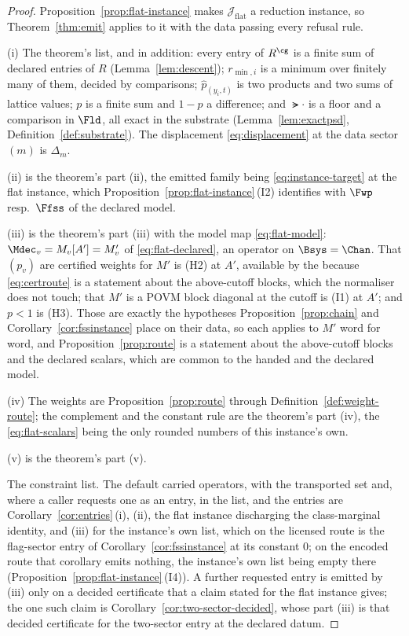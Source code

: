 \begin{proof}
Proposition~\ref{prop:flat-instance} makes $\mathcal{J}_{\mathrm{flat}}$ a
reduction instance, so Theorem~\ref{thm:emit} applies to it with the data
passing every refusal rule.

(i) The theorem's list, and in addition: every entry of
$R^{\cg}$ is a finite sum of declared entries of $R$ (Lemma~\ref{lem:descent});
$r_{\min,i}$ is a minimum over finitely many of them, decided by comparisons;
$\hat p_{(y_i,t)}$ is two products and two sums of lattice values;
$p$ is a finite sum and $1-p$ a difference; and $\lat{\cdot}$ is a floor and
a comparison in $\Fld$, all exact in the substrate
(Lemma~\ref{lem:exactpsd}, Definition~\ref{def:substrate}). The displacement
\eqref{eq:displacement} at the data sector $(m)$ is $\Delta_m$.

(ii) is the theorem's part (ii), the emitted family being
\eqref{eq:instance-target} at the flat instance, which
Proposition~\ref{prop:flat-instance}\,(I2) identifies with $\Fwp$ resp.\
$\Ffss$ of the declared model.

(iii) is the theorem's part (iii) with the model map \eqref{eq:flat-model}:
$\Mdec_v=M_v[A']=M'_v$ of \eqref{eq:flat-declared}, an operator on $\Bsys=\Chan$.
That $(p_v)$ are certified weights for $M'$ is (H2) at $A'$, available by the
\tref{stability clause} because \eqref{eq:certroute} is a statement about the
above-cutoff blocks, which the normaliser does not touch; that $M'$ is a POVM
block diagonal at the cutoff is (I1) at $A'$; and $p<1$ is (H3). Those are
exactly the hypotheses Proposition~\ref{prop:chain} and
Corollary~\ref{cor:fssinstance} place on their data, so each applies to $M'$
word for word, and Proposition~\ref{prop:route} is a statement about the
above-cutoff blocks and the declared scalars, which are common to the handed
and the declared model.

(iv) The weights are Proposition~\ref{prop:route}
through Definition~\ref{def:weight-route}; the complement and the constant
rule are the theorem's part (iv), the \tref[scalar value]{scalar values}
\eqref{eq:flat-scalars}
being the only rounded numbers of this instance's own.

(v) is the theorem's part (v).

The constraint list. The default carried operators, with the transported
set and, where a caller requests one as an entry, in the list, and the
entries are Corollary~\ref{cor:entries}\,(i), (ii), the
flat instance discharging the class-marginal identity, and (iii) for the
instance's own list, which on the licensed route is the flag-sector entry of
Corollary~\ref{cor:fssinstance} at its constant $0$; on the encoded route
that corollary emits nothing, the instance's own list being empty there
(Proposition~\ref{prop:flat-instance}\,(I4)). A further requested entry is
emitted by (iii) only on a decided certificate that a claim stated for the
flat instance gives; the one such claim is
Corollary~\ref{cor:two-sector-decided}, whose part (iii) is that decided
certificate for the two-sector entry at the declared datum.
\end{proof}
